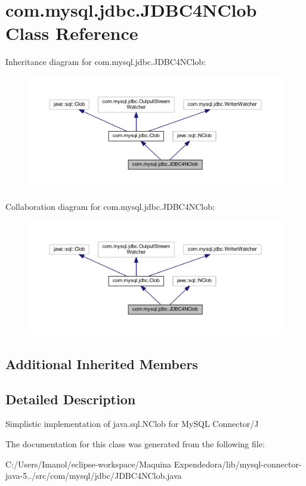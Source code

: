 \hypertarget{classcom_1_1mysql_1_1jdbc_1_1_j_d_b_c4_n_clob}{}\section{com.\+mysql.\+jdbc.\+J\+D\+B\+C4\+N\+Clob Class Reference}
\label{classcom_1_1mysql_1_1jdbc_1_1_j_d_b_c4_n_clob}


Inheritance diagram for com.\+mysql.\+jdbc.\+J\+D\+B\+C4\+N\+Clob\+:
\nopagebreak
\begin{figure}[H]
\begin{center}
\leavevmode
\includegraphics[width=350pt]{classcom_1_1mysql_1_1jdbc_1_1_j_d_b_c4_n_clob__inherit__graph}
\end{center}
\end{figure}


Collaboration diagram for com.\+mysql.\+jdbc.\+J\+D\+B\+C4\+N\+Clob\+:
\nopagebreak
\begin{figure}[H]
\begin{center}
\leavevmode
\includegraphics[width=350pt]{classcom_1_1mysql_1_1jdbc_1_1_j_d_b_c4_n_clob__coll__graph}
\end{center}
\end{figure}
\subsection*{Additional Inherited Members}


\subsection{Detailed Description}
Simplistic implementation of java.\+sql.\+N\+Clob for My\+S\+QL Connector/J 

The documentation for this class was generated from the following file\+:\begin{DoxyCompactItemize}
\item 
C\+:/\+Users/\+Imanol/eclipse-\/workspace/\+Maquina Expendedora/lib/mysql-\/connector-\/java-\/5../src/com/mysql/jdbc/J\+D\+B\+C4\+N\+Clob.\+java\end{DoxyCompactItemize}
